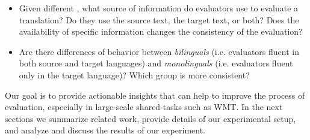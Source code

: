 \begin{itemize}
\item Given different \gamets, what source of information do evaluators use to evaluate a translation? Do they use the source text, the target text, or both? Does the availability of specific information changes the consistency of the evaluation?


\item Are there differences of behavior between \emph{bilinguals} (i.e. evaluators fluent in both source and target languages) and \emph{monolinguals} (i.e. evaluators fluent only in the target language)?
Which group is more consistent?


\end{itemize}

Our goal is to provide actionable insights that can help to improve the process of evaluation, especially in large-scale shared-tasks such as WMT. In the next sections we summarize related work, provide details of our experimental setup, and analyze and discuss the results of our experiment. 

